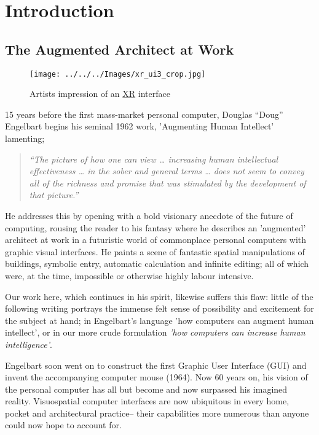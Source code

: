 \documentclass[logo,bsc,singlespacing,parskip]{infthesis}
\begin{document}
\part*{Introduction}
\label{sec:orga9e4dd3}
\chapter*{The Augmented Architect at Work}
\label{sec:orgef2db39}
\begin{figure}[h]
\centering
\texttt{[image: ../../../Images/xr\_ui3\_crop.jpg]}
\caption{Artists impression of an \hyperref[org88b0f70]{XR} interface}
\end{figure}

15 years before the first mass-market personal computer, Douglas ``Doug'' Engelbart begins his seminal 1962 work, 'Augmenting Human Intellect' \autocite{engelbartAugmentingHumanIntellect1962} lamenting;

\begin{quote}
\emph{``The picture of how one can view \ldots{} increasing human intellectual effectiveness \ldots{} in the sober and general terms \ldots{} does not seem to convey all of the richness and promise that was stimulated by the development of that picture.''}
\end{quote}

He addresses this by opening with a bold visionary anecdote of the future of computing, rousing the reader to his fantasy where he describes an 'augmented' architect at work in a futuristic world of commonplace personal computers with graphic visual interfaces.
He paints a scene of fantastic spatial manipulations of buildings, symbolic entry, automatic calculation and infinite editing; all of which were, at the time, impossible or otherwise highly labour intensive.

Our work here, which continues in his spirit, likewise suffers this flaw: little of the following writing portrays the immense felt sense of possibility and excitement for the subject at hand; in Engelbart's language 'how computers can augment human intellect', or in our more crude formulation \emph{'how computers can increase human intelligence'}.

Engelbart soon went on to construct the first Graphic User Interface (GUI) and invent the accompanying computer mouse (1964).
Now 60 years on, his vision of the personal computer has all but become and now surpassed his imagined reality.
Visuospatial computer interfaces are now ubiquitous in every home, pocket and architectural practice-- their capabilities more numerous than anyone could now hope to account for.
\end{document}

